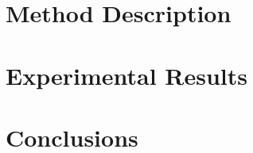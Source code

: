 \documentclass{article}
\begin{document}
\section{Method Description}


\section{Experimental Results}



\section{Conclusions}





\end{document}
